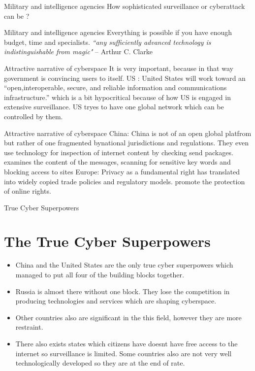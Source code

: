 \documentclass[xcolor=table]{beamer}
\begin{document}
\begin{frame}{Military and intelligence agencies}
\Huge{How sophisticated surveillance or  cyberattack can be ?}
\end{frame}
\begin{frame}{Military and intelligence agencies}
Everything is possible if you have enough budget, time and specialists.\newline\newline
\textit{“any sufficiently advanced technology is indistinguishable from magic"} -- Arthur C. Clarke 
\end{frame}
\begin{frame}{Attractive narrative of cyberspace}
It is very important, because in that way government is convincing users to itself. \newline\newline
US : \newline
United States will work toward an “open,interoperable, secure, and reliable information and communications infrastructure.” which is a bit hypocritical because of how US is engaged in extensive surveillance.
US tryes to have one global network which can be controlled by them.
\end{frame}
\begin{frame}{Attractive narrative of cyberspace}
China: \newline
China is not of an open global platfrom but rather of one fragmented bynational jurisdictions and regulations.
They even use technology for inspection of internet content by checking send packages.
examines the content of the messages, scanning for sensitive key words and blocking access to sites
\newline\newline
Europe:\newline
Privacy as a fundamental right has translated into widely copied trade policies
and regulatory models. promote the protection of online rights. 
\end{frame}
\begin{frame}{True Cyber Superpowers}
\section{The True Cyber Superpowers}
\begin{itemize}
\item China and the United States are the only true cyber superpowers which managed to put all four of the building blocks together. 
\item Russia is almost there without one block. They lose the competition in producing technologies and services which are shaping cyberspace.
\item Other countries also are significant in the this field, however they are more restraint. 
\item There also exists states which citizens have doesnt have free access to the internet so surveillance is limited. Some countries also are not very well technologically developed so they are at the end of rate.
\end{itemize}
\end{frame}
\end{document}
